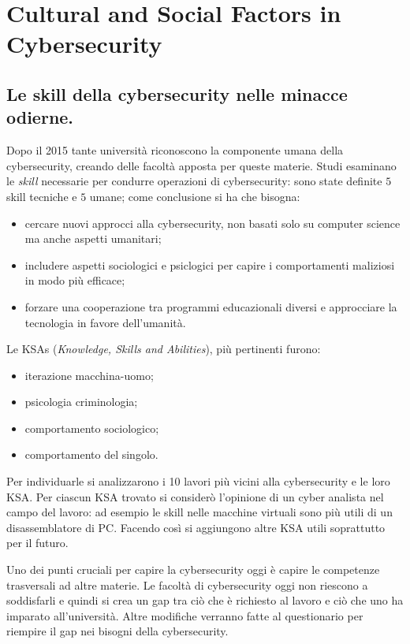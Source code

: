 \documentclass[a4page, 11pt, twocolumn]{article}
\begin{document}
\section{Cultural and Social Factors in Cybersecurity}

\subsection{Le skill della cybersecurity nelle minacce odierne.}
Dopo il 2015 tante università riconoscono la componente umana della cybersecurity, creando delle facoltà apposta per queste materie.
Studi esaminano le \textit{skill} necessarie per condurre operazioni di cybersecurity: sono state definite $5$ skill tecniche e $5$ umane; come conclusione si ha che bisogna:
\begin{itemize}
  \item cercare nuovi approcci alla cybersecurity, non basati solo su computer science ma anche aspetti umanitari;
  \item includere aspetti sociologici e psiclogici per capire i comportamenti maliziosi in modo più efficace;
  \item forzare una cooperazione tra programmi educazionali diversi e approcciare la tecnologia in favore dell'umanità.
\end{itemize}

Le KSAs (\textit{Knowledge, Skills and Abilities}), più pertinenti furono:
\begin{itemize}
  \item iterazione macchina-uomo;
  \item psicologia criminologia;
  \item comportamento sociologico;
  \item comportamento del singolo.
\end{itemize}
Per individuarle si analizzarono i 10 lavori più vicini alla cybersecurity e le loro KSA.
Per ciascun KSA trovato si considerò l'opinione di un cyber analista nel campo del lavoro: ad esempio le skill nelle macchine virtuali sono più utili di un disassemblatore di PC.
Facendo così si aggiungono altre KSA utili soprattutto per il futuro.

Uno dei punti cruciali per capire la cybersecurity oggi è capire le competenze trasversali ad altre materie.
Le facoltà di cybersecurity oggi non riescono a soddisfarli e quindi si crea un gap tra ciò che è richiesto al lavoro e ciò che uno ha imparato all'università.
Altre modifiche verranno fatte al questionario per riempire il gap nei bisogni della cybersecurity.
\end{document}
